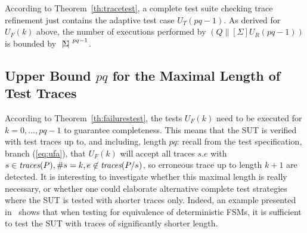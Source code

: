 According to Theorem~\ref{th:tracetest}, a complete test suite checking trace
refinement just contains the adaptive test case $U_T(pq-1)$. As derived for
$U_F(k)$ above, the number of executions performed by $(Q\parallel[\Sigma]
U_R(pq-1))$ is bounded by ${~|\! \Sigma\!|~}^{pq-1}$. 

\subsection{Upper Bound $pq$ for the Maximal Length of Test Traces}

According to Theorem~\ref{th:failurestest}, the tests $U_F(k)$ need to be
executed for $k = 0,\dots,pq-1$ to guarantee completeness. This means that
the SUT is verified with test traces up to, and including, length $pq$:
recall from the test specification, branch (\ref{eq:ufa}), that $U_F(k)$ will
accept all traces $s.e$ with $s\in\text{\it traces}(P), \#s = k, e\not\in\text{\it traces}(P/s)$, so
erroneous trace up to length $k+1$ are detected. It is interesting to
investigate whether this maximal length is really necessary, or whether one
could elaborate alternative complete test strategies where the SUT is tested
with shorter traces only. Indeed, an example  presented
in~\cite[Exercise~5]{PeleskaHuangLectureNotesMBT} shows that when testing for
equivalence of deterministic FSMs, it is sufficient to test the SUT with
traces of significantly shorter length.

